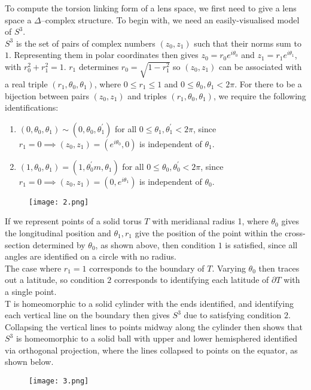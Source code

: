 \documentclass{article}
\begin{document}
\noindent To compute the torsion linking form of a lens space, we first need to give a lens space a $\Delta$--complex structure. To begin with, we need an easily-visualised model of $S^3$.\\

\noindent$S^3$ is the set of pairs of complex numbers $(z_0,z_1)$ such that their norms sum to $1$. Representing them in polar coordinates then gives $z_0=r_0e^{i\theta_0}$ and $z_1=r_1e^{i\theta_1}$, with $r_0^2+r_1^2=1$. $r_1$ determines $r_0=\sqrt{1-r_1^2}$ so $(z_0,z_1)$ can be associated with a real triple $(r_1,\theta_0,\theta_1)$, where $0\leq r_1\leq 1$ and $0\leq\theta_0,\theta_1<2\pi$.
For there to be a bijection between pairs $(z_0,z_1)$ and triples $(r_1,\theta_0,\theta_1)$, we require the following identifications:
\begin{enumerate}
\item $(0,\theta_0,\theta_1)\sim(0,\theta_0,\theta_1^{'})$ for all $0\leq\theta_1,\theta_1^{'}<2\pi$, since $r_1=0\implies (z_0,z_1)=(e^{i\theta_0},0)$ is independent of $\theta_1$.
\item $(1,\theta_0,\theta_1)=(1,\theta_0^{'}m,\theta_1)$ for all $0\leq\theta_0,\theta_0^{'}<2\pi$, since $r_1=0\implies (z_0,z_1)=(0,e^{i\theta_1})$ is independent of $\theta_0$.
\end{enumerate}


\begin{figure} [hbt!]
    \centering
    \texttt{[image: 2.png]}
\end{figure}

\noindent If we represent points of a solid torus $T$ with meridianal radius 1, where $\theta_0$ gives the longitudinal position and $\theta_1,r_1$ give the position of the point within the cross-section determined by $\theta_0$, as shown above, then condition $1$ is satisfied, since all angles are identified on a circle with no radius.\\

\noindent The case where $r_1=1$ corresponds to the boundary of $T$. Varying $\theta_0$ then traces out a latitude, so condition $2$ corresponds to identifying each latitude of $\partial T$ with a single point.\\

\noindent T is homeomorphic to a solid cylinder with the ends identified, and identifying each vertical line on the boundary then gives $S^3$ due to satisfying condition $2$. Collapsing the vertical lines to points midway along the cylinder then shows that $S^3$ is homeomorphic to a solid ball with upper and lower hemisphered identified via orthogonal projection, where the lines collapsed to points on the equator, as shown below.\\
\begin{figure} [hbt!]
    \centering
    \texttt{[image: 3.png]}
\end{figure}
\end{document}
